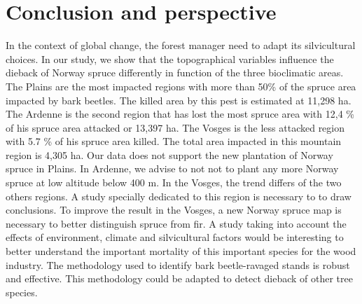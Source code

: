 \documentclass[3p,procedia]{elsarticle}
\begin{document}
 
\section{Conclusion and perspective}

In the context of global change, the forest manager need to adapt its silvicultural choices.
In our study, we show that the topographical variables influence the dieback of Norway spruce differently in function of the three bioclimatic areas.
The Plains are the most impacted regions with more than 50\% of the spruce area impacted by bark beetles. The killed area by this pest is estimated at 11,298 ha.
The Ardenne is the second region that has lost the most spruce area with  12,4 \% of his spruce area attacked or 13,397 ha. 
The Vosges is the less attacked region with 5.7 \% of his spruce area killed. The total area impacted in this mountain region is  4,305 ha.
Our data does not support the new plantation of Norway spruce in Plains.
In Ardenne, we advise to not not to plant any more Norway spruce at low altitude below 400 m.
In the Vosges, the trend differs of the two others regions.
A study specially dedicated to this region is necessary to to draw conclusions.
To improve the result in the Vosges, a new Norway spruce map is necessary to better distinguish spruce from fir.
A study taking into account the effects of environment, climate and silvicultural factors would be interesting to better understand the important mortality of this important species for the wood industry.
The methodology used to identify bark beetle-ravaged stands is robust and effective. This methodology could be adapted to detect dieback of other tree species.











	

\end{document}
